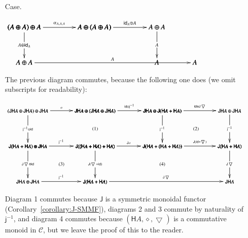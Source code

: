 \documentclass{lmcs}
\let\c\relax
\let\wn\relax
\newcommand{\cat}[1]{\mathcal{#1}}
\newcommand{\func}[1]{\mathsf{#1}}
\newcommand{\id}[0]{\mathsf{id}}
\newcommand{\c}[1]{\mathsf{c}_{#1}}
\newcommand{\jinv}[1]{\mathsf{j}^{-1}_{#1}}
\newcommand{\wn}[0]{\mathop{?}}
\newcommand{\codiag}[1]{\bigtriangledown_{#1}}
\newenvironment{diagram}{
  \begin{center}
    \begin{math}
      \bfig
}{
      \efig
    \end{math}
  \end{center}
}
\begin{document}
\begin{itemize}
\item[Case.]\ \\
  \begin{diagram}
    \hSquares|aammmmm|/->`->```->``/[
      (\wn A \oplus \wn A) \oplus \wn A`
      \wn A \oplus (\wn A \oplus \wn A)`
      \wn A \oplus \wn A```
      \wn A;
      \alpha_{\wn A,\wn A,\wn A}`
      \id_{\wn A} \oplus \c{A}```
      \c{A}``]
    \btriangle|maa|/->``->/<2407,500>[(\wn A \oplus \wn A) \oplus \wn A`
      \wn A \oplus \wn A`
      \wn A;
      \c{A} \oplus \id_{A}``
      \c{A}]
  \end{diagram}
  The previous diagram commutes, because the following one does (we
  omit subscripts for readability):
  \begin{diagram}
    \scriptsize
    \square|amma|/->`->``->/<950,500>[
      (\func{JH}A \oplus \func{JH}A) \oplus \func{JH}A`
      \func{JH}A \oplus (\func{JH}A \oplus \func{JH}A)`
      \func{J}(\func{H}A + \func{H}A) \oplus \func{JH}A`
      \func{J}((\func{H}A + \func{H}A) + \func{H}A);
      \alpha`
      \jinv{} \oplus \id``
      \jinv{}]

    \square(950,0)|amma|/->``->`->/<950,500>[
      \func{JH}A \oplus (\func{JH}A \oplus \func{JH}A)`
      \func{JH}A \oplus \func{J}(\func{H}A + \func{H}A)`
      \func{J}((\func{H}A + \func{H}A) + \func{H}A)`
      \func{J}(\func{H}A + (\func{H}A + \func{H}A));
      \id \oplus \jinv{}``
      \jinv{}`
      \func{J}\alpha]

    \square(1900,0)|amma|/->``->`->/<950,500>[
      \func{JH}A \oplus \func{J}(\func{H}A + \func{H}A)`
      \func{JH}A \oplus \func{JH}A`
      \func{J}(\func{H}A + (\func{H}A + \func{H}A))`
      \func{J}(\func{H}A + \func{H}A);
      \id \oplus \func{J}\codiag{}``
      \jinv{}`
      \func{J}(\id + \codiag{})]

    \square(0,-500)|amma|/`->`->`->/<950,500>[
      \func{J}(\func{H}A + \func{H}A) \oplus \func{JH}A`
      \func{J}((\func{H}A + \func{H}A) + \func{H}A)`
      \func{JH}A \oplus \func{JH}A`
      \func{J}(\func{H}A + \func{H}A);`
      \func{J}\codiag{} \oplus \id`
      \func{J}(\codiag{} + \id)`
      \jinv{}]

    \dtriangle(950,-500)|ama|/`->`->/<1900,500>[
      \func{J}(\func{H}A + \func{H}A)`
      \func{J}(\func{H}A + \func{H}A)`
      \func{JH}A;`
      \func{J}\codiag{}`
      \func{J}\codiag{}]

    \place(950,250)[(1)]
    \place(2375,250)[(2)]
    \place(475,-250)[(3)]
    \place(1900,-250)[(4)]
  \end{diagram}
  Diagram 1 commutes because $\func{J}$ is a symmetric monoidal
  functor (Corollary~\ref{corollary:J-SMMF}), diagrams 2 and 3
  commute by naturality of $\jinv{}$, and diagram 4 commutes because
  $(\func{H}A, \diamond, \codiag{})$ is a commutative monoid in
  $\cat{C}$, but we leave the proof of this to the reader.


\end{itemize}
\end{document}
